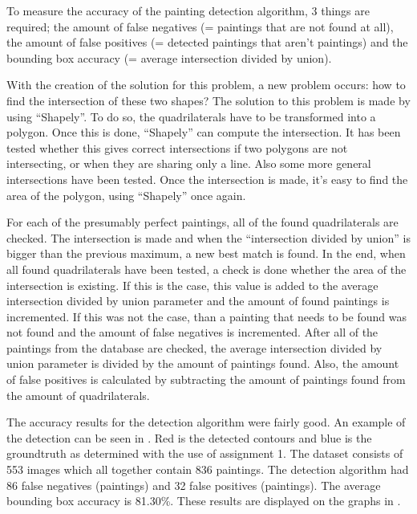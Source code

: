 To measure the accuracy of the painting detection algorithm, 3 things are required; the amount of false negatives (= paintings that are not found at all), the amount of false positives (= detected paintings that aren't paintings) and the bounding box accuracy (= average intersection divided by union).

With the creation of the solution for this problem, a new problem occurs: how to find the intersection of these two shapes? The solution to this problem is made by using ``Shapely''. To do so, the quadrilaterals have to be transformed into a polygon. Once this is done, ``Shapely'' can compute the intersection. It has been tested whether this gives correct intersections if two polygons are not intersecting, or when they are sharing only a line. Also some more general intersections have been tested. Once the intersection is made, it's easy to find the area of the polygon, using ``Shapely'' once again.

For each of the presumably perfect paintings, all of the found quadrilaterals are checked. The intersection is made and when the ``intersection divided by union'' is bigger than the previous maximum, a new best match is found. In the end, when all found quadrilaterals have been tested, a check is done whether the area of the intersection is existing. If this is the case, this value is added to the average intersection divided by union parameter and the amount of found paintings is incremented. If this was not the case, than a painting that needs to be found was not found and the amount of false negatives is incremented. After all of the paintings from the database are checked, the average intersection divided by union parameter is divided by the amount of paintings found. Also, the amount of false positives is calculated by subtracting the amount of paintings found from the amount of quadrilaterals.

The accuracy results for the detection algorithm were fairly good. An example of the detection can be seen in . Red is the detected contours and blue is the groundtruth as determined with the use of assignment 1. The dataset consists of 553 images which all together contain 836 paintings. The detection algorithm had 86 false negatives (paintings) and 32 false positives (paintings). The average bounding box accuracy is 81.30\%. These results are displayed on the graphs in .

